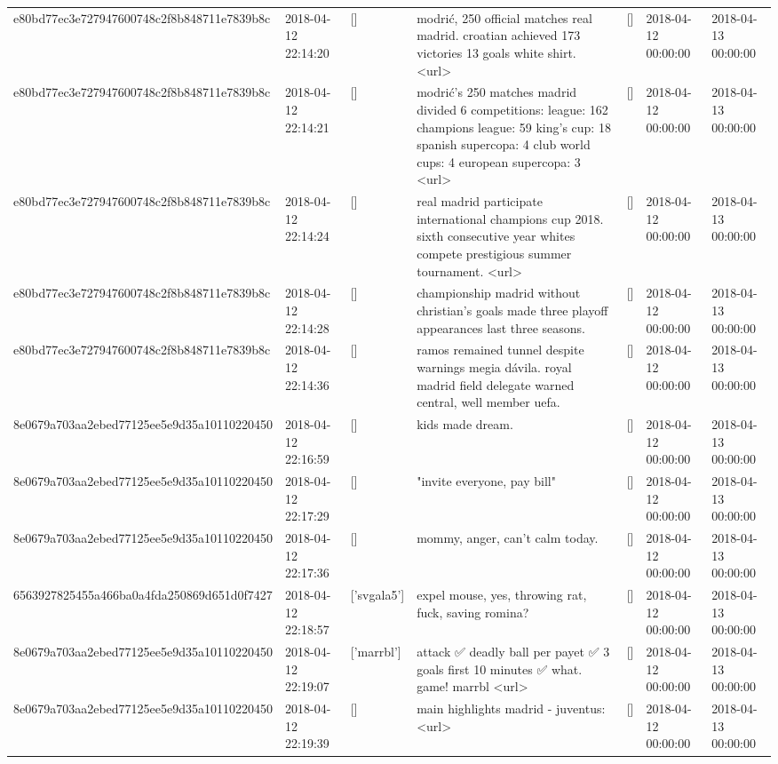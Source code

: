 \begin{tabular}{lllllll}
e80bd77ec3e727947600748c2f8b848711e7839b8c & 2018-04-12 22:14:20 & [] & modrić, 250 official matches real madrid. croatian achieved 173 victories 13 goals white shirt. <url> & [] & 2018-04-12 00:00:00 & 2018-04-13 00:00:00 \\
e80bd77ec3e727947600748c2f8b848711e7839b8c & 2018-04-12 22:14:21 & [] & modrić's 250 matches madrid divided 6 competitions: league: 162 champions league: 59 king's cup: 18 spanish supercopa: 4 club world cups: 4 european supercopa: 3 <url> & [] & 2018-04-12 00:00:00 & 2018-04-13 00:00:00 \\
e80bd77ec3e727947600748c2f8b848711e7839b8c & 2018-04-12 22:14:24 & [] & real madrid participate international champions cup 2018. sixth consecutive year whites compete prestigious summer tournament. <url> & [] & 2018-04-12 00:00:00 & 2018-04-13 00:00:00 \\
e80bd77ec3e727947600748c2f8b848711e7839b8c & 2018-04-12 22:14:28 & [] & championship madrid without christian's goals made three playoff appearances last three seasons. & [] & 2018-04-12 00:00:00 & 2018-04-13 00:00:00 \\
e80bd77ec3e727947600748c2f8b848711e7839b8c & 2018-04-12 22:14:36 & [] & ramos remained tunnel despite warnings megia dávila. royal madrid field delegate warned central, well member uefa. & [] & 2018-04-12 00:00:00 & 2018-04-13 00:00:00 \\
8e0679a703aa2ebed77125ee5e9d35a10110220450 & 2018-04-12 22:16:59 & [] & kids made dream. & [] & 2018-04-12 00:00:00 & 2018-04-13 00:00:00 \\
8e0679a703aa2ebed77125ee5e9d35a10110220450 & 2018-04-12 22:17:29 & [] & "invite everyone, pay bill" & [] & 2018-04-12 00:00:00 & 2018-04-13 00:00:00 \\
8e0679a703aa2ebed77125ee5e9d35a10110220450 & 2018-04-12 22:17:36 & [] & mommy, anger, can't calm today. & [] & 2018-04-12 00:00:00 & 2018-04-13 00:00:00 \\
6563927825455a466ba0a4fda250869d651d0f7427 & 2018-04-12 22:18:57 & ['svgala5'] & expel mouse, yes, throwing rat, fuck, saving romina? & [] & 2018-04-12 00:00:00 & 2018-04-13 00:00:00 \\
8e0679a703aa2ebed77125ee5e9d35a10110220450 & 2018-04-12 22:19:07 & ['marrbl'] & attack ✅ deadly ball per payet ✅ 3 goals first 10 minutes ✅ what. game! marrbl <url> & [] & 2018-04-12 00:00:00 & 2018-04-13 00:00:00 \\
8e0679a703aa2ebed77125ee5e9d35a10110220450 & 2018-04-12 22:19:39 & [] & main highlights madrid - juventus: <url> & [] & 2018-04-12 00:00:00 & 2018-04-13 00:00:00 \\

\end{tabular}

